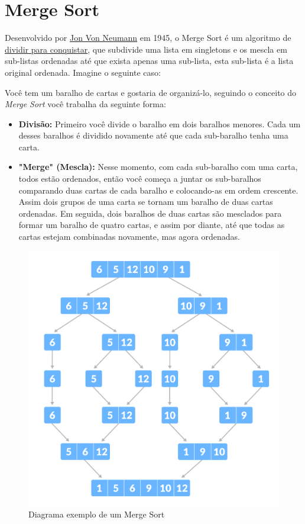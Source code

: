 \section{Merge Sort}
\label{sec:merge-sort-teo}

Desenvolvido por \href{https://en.wikipedia.org/wiki/John_von_Neumann}{Jon Von Neumann} em 1945, o Merge Sort é um algoritmo de \href{https://en.wikipedia.org/wiki/Divide-and-conquer_algorithm}{dividir para conquistar}, que subdivide uma lista em singletons e os mescla em sub-listas ordenadas até que exista apenas uma sub-lista, esta sub-lista é a lista original ordenada. Imagine o seguinte caso:

Você tem um baralho de cartas e gostaria de organizá-lo, seguindo o conceito do \textit{Merge Sort} você trabalha da seguinte forma:
\begin{itemize}
	\item \textbf{Divisão:} Primeiro você divide o baralho em dois baralhos menores. Cada um desses baralhos é dividido novamente até que cada sub-baralho tenha uma carta.
	\item \textbf{"Merge" (Mescla):} Nesse momento, com cada sub-baralho com uma carta, todos estão ordenados, então você começa a juntar os sub-baralhos comparando duas cartas de cada baralho e colocando-as em ordem crescente. Assim dois grupos de uma carta se tornam um baralho de duas cartas ordenadas. Em seguida, dois baralhos de duas cartas são mesclados para formar um baralho de quatro cartas, e assim por diante, até que todas as cartas estejam combinadas novamente, mas agora ordenadas.
\end{itemize}
\begin{figure}[!ht]
	\centering
	\includegraphics[scale=0.4]{figures/merge-sort-example_0.png}
	\caption{Diagrama exemplo de um Merge Sort}
	\label{fig:merge_sort_example_0}
\end{figure}

